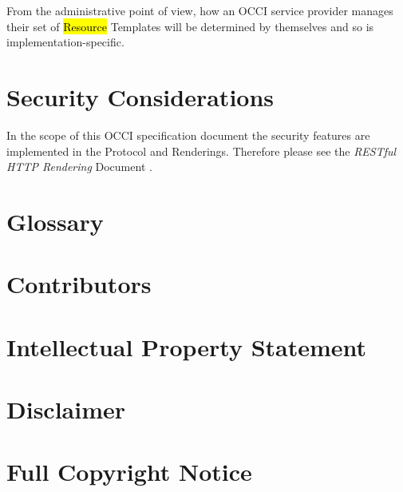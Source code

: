 \documentclass[10pt,a4paper]{article}
\begin{document}

From the administrative point of view, how an OCCI service provider manages their set of 
\hl{Resource} Templates will be determined by themselves and so is implementation-specific.


\section{Security Considerations}
In the scope of this OCCI specification document the security features
are implemented in the Protocol and Renderings. Therefore please see
the \emph{RESTful HTTP Rendering} Document \cite{occi:http_rendering}.

\section{Glossary}
\label{sec:glossary}


\section{Contributors}


\section{Intellectual Property Statement}


\section{Disclaimer}


\section{Full Copyright Notice}




\end{document}
